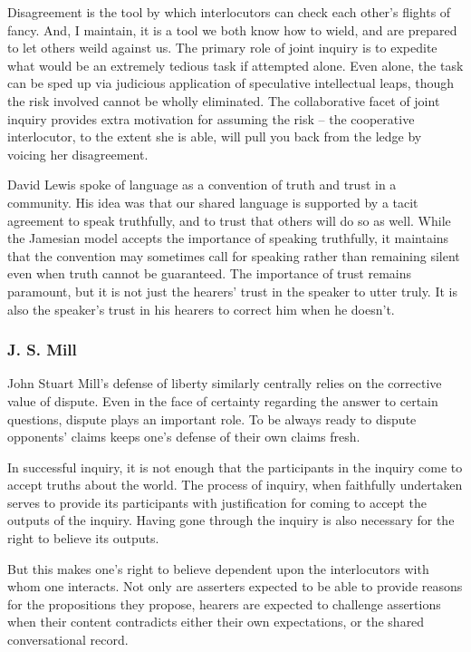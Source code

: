 \documentclass[letterpaper,]{article}
\begin{document}
Disagreement is the tool by which interlocutors can check each other's
flights of fancy. And, I maintain, it is a tool we both know how to
wield, and are prepared to let others weild against us. The primary role
of joint inquiry is to expedite what would be an extremely tedious task
if attempted alone. Even alone, the task can be sped up via judicious
application of speculative intellectual leaps, though the risk involved
cannot be wholly eliminated. The collaborative facet of joint inquiry
provides extra motivation for assuming the risk -- the cooperative
interlocutor, to the extent she is able, will pull you back from the
ledge by voicing her disagreement.

David Lewis \autocite*{Lewis1975b} spoke of language as a convention of
truth and trust in a community. His idea was that our shared language is
supported by a tacit agreement to speak truthfully, and to trust that
others will do so as well. While the Jamesian model accepts the
importance of speaking truthfully, it maintains that the convention may
sometimes call for speaking rather than remaining silent even when truth
cannot be guaranteed. The importance of trust remains paramount, but it
is not just the hearers' trust in the speaker to utter truly. It is also
the speaker's trust in his hearers to correct him when he doesn't.

\subsubsection{J. S. Mill}\label{mill}

John Stuart Mill's \autocite*{mill1859} defense of liberty similarly
centrally relies on the corrective value of dispute. Even in the face of
certainty regarding the answer to certain questions, dispute plays an
important role. To be always ready to dispute opponents' claims keeps
one's defense of their own claims fresh.

In successful inquiry, it is not enough that the participants in the
inquiry come to accept truths about the world. The process of inquiry,
when faithfully undertaken serves to provide its participants with
justification for coming to accept the outputs of the inquiry. Having
gone through the inquiry is also necessary for the right to believe its
outputs.

But this makes one's right to believe dependent upon the interlocutors
with whom one interacts. Not only are asserters expected to be able to
provide reasons for the propositions they propose, hearers are expected
to challenge assertions when their content contradicts either their own
expectations, or the shared conversational record.
\end{document}
